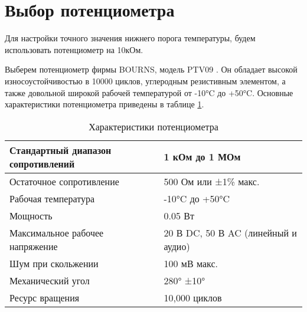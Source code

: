 \section {Выбор потенциометра}

Для настройки точного значения нижнего порога температуры, будем использовать потенциометр на 10кОм.

Выберем потенциометр фирмы BOURNS, модель PTV09 \cite{datasheet::Potentiometr}. Он обладает высокой износоустойчивостью в 10000 циклов, углеродным резистивным элементом, а также довольной широкой рабочей температурой от -10°C до +50°C. Основные характеристики потенциометра приведены в таблице \ref{tab::PotentiometerCharact}.

\begin{table}[h!]
	\centering
	\caption{Характеристики потенциометра}
	\begin{tabular}{| m{6cm} | m{8cm} |}
		\hline
		Стандартный диапазон сопротивлений & 1 кОм до 1 МОм \\ \hline
		Остаточное сопротивление & 500 Ом или ±1\% макс. \\ \hline
		Рабочая температура & -10°C до +50°C \\ \hline
		Мощность & 0.05 Вт\\ \hline
		Максимальное рабочее напряжение & 20 В DC, 50 В AC (линейный и аудио) \\ \hline
		Шум при скольжении & 100 мВ макс. \\ \hline
		Механический угол & 280° ±10° \\ \hline
		Ресурс вращения & 10,000 циклов \\ \hline
	\end{tabular}
	\label{tab::PotentiometerCharact}
\end{table}